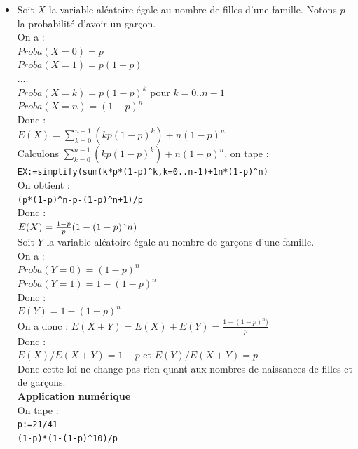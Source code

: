 \documentclass[a4paper,11pt]{book}
\begin{document}
\begin{itemize}
{\tt 1-p\verb|^|10}\\
On obtient :\\
{\tt 1023/1024}\\
Avec {\tt evalf} on obtient :\\
{\tt  0.990234375}\\
Donc cette loi ne favorise pas la naissance des filles ni celle des gar\c{c}ons.\item Soit $X$ la variable al\'eatoire \'egale au nombre de filles d'une 
famille. Notons $p$ la probabilit\'e d'avoir un gar\c{c}on.\\
On a :\\
$Proba(X=0)=p$\\
$Proba(X=1)=p(1-p)$\\
....\\
$Proba(X=k)=p(1-p)^k$ pour $k=0..n-1$\\
$Proba(X=n)=(1-p)^{n}$\\
Donc :\\
$E(X)=\sum_{k=0}^{n-1}(kp(1-p)^k)+n(1-p)^n$\\
Calculons $\sum_{k=0}^{n-1}(kp(1-p)^k)+n(1-p)^n$, on tape :\\
{\tt EX:=simplify(sum(k*p*(1-p)\verb|^|k,k=0..n-1)+1n*(1-p)\verb|^|n)}\\
On obtient :\\
{\tt (p*(1-p)\verb|^|n-p-(1-p)\verb|^|n+1)/p}\\
Donc :\\
$E(X)=\frac{1-p}{p}(1-(1-p)\verb|^|n)$\\
Soit $Y$ la variable al\'eatoire \'egale au nombre de 
gar\c{c}ons d'une famille.\\
On a :\\
$Proba(Y=0)=(1-p)^n$\\ 
$Proba(Y=1)=1-(1-p)^n$\\ 
Donc :\\
$E(Y)=1-(1-p)^n$\\
On a donc :
$E(X+Y)=E(X)+E(Y)=\frac{1-(1-p)^n)}{p}$\\
Donc :\\
$E(X)/E(X+Y)=1-p$ et $E(Y)/E(X+Y)=p$\\
Donc cette loi ne change pas rien quant aux nombres de naissances de filles et 
de gar\c{c}ons.\\
{\bf Application num\'erique}\\
On tape :\\
{\tt p:=21/41}\\
{\tt (1-p)*(1-(1-p)\verb|^|10)/p}\\

\end{itemize}
\end{document}
